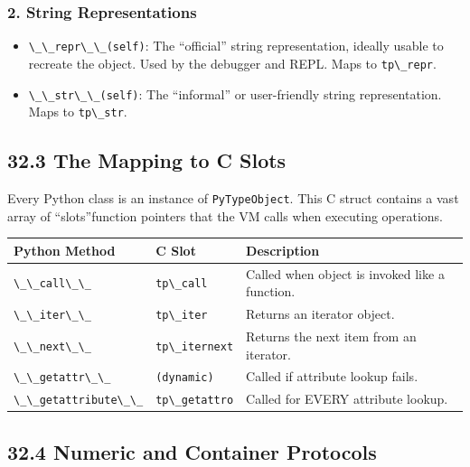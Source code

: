 \hypertarget{string-representations}{%
\subsubsection{2. String Representations}\label{string-representations}}

\begin{itemize}
\tightlist
\item
  \passthrough{\lstinline!\_\_repr\_\_(self)!}: The ``official'' string
  representation, ideally usable to recreate the object. Used by the
  debugger and REPL. Maps to \passthrough{\lstinline!tp\_repr!}.
\item
  \passthrough{\lstinline!\_\_str\_\_(self)!}: The ``informal'' or
  user-friendly string representation. Maps to
  \passthrough{\lstinline!tp\_str!}.
\end{itemize}

\hypertarget{the-mapping-to-c-slots}{%
\subsection{32.3 The Mapping to C Slots}\label{the-mapping-to-c-slots}}

Every Python class is an instance of
\passthrough{\lstinline!PyTypeObject!}. This C struct contains a vast
array of ``slots''function pointers that the VM calls when executing
operations.

\begin{longtable}[]{@{}lll@{}}
\toprule
Python Method & C Slot & Description \\
\midrule
\endhead
\passthrough{\lstinline!\_\_call\_\_!} &
\passthrough{\lstinline!tp\_call!} & Called when object is invoked like
a function. \\
\passthrough{\lstinline!\_\_iter\_\_!} &
\passthrough{\lstinline!tp\_iter!} & Returns an iterator object. \\
\passthrough{\lstinline!\_\_next\_\_!} &
\passthrough{\lstinline!tp\_iternext!} & Returns the next item from an
iterator. \\
\passthrough{\lstinline!\_\_getattr\_\_!} &
\passthrough{\lstinline!(dynamic)!} & Called if attribute lookup
fails. \\
\passthrough{\lstinline!\_\_getattribute\_\_!} &
\passthrough{\lstinline!tp\_getattro!} & Called for EVERY attribute
lookup. \\
\bottomrule
\end{longtable}

\hypertarget{numeric-and-container-protocols}{%
\subsection{32.4 Numeric and Container
Protocols}\label{numeric-and-container-protocols}}

